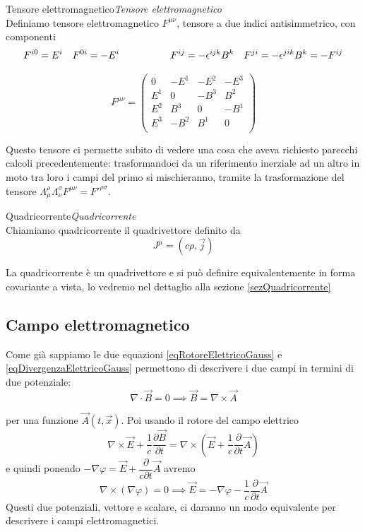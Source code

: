 \documentclass[12pt,a4paper,titlepage, twoside, openright]{book}
\newenvironment{definizione}[1][\empty]{\begin{Definizione}{
\ifx\empty#1\relax\else\mdseries\itshape#1\\\fi
}{}}{\end{Definizione}}
\numberwithin{equation}{chapter}
\begin{document}
\begin{definizione}[Tensore elettromagnetico]
Definiamo tensore elettromagnetico $F^{\mu\nu}$, tensore a due indici antisimmetrico, con componenti
\[
F^{i0}=E^i \quad F^{0i}=-E^i \hspace{0.15\linewidth} F^{ij}= - \epsilon^{ijk} B^k \quad F^{ji}= - \epsilon^{jik} B^k = - F^{ij}
\]

\begin{equation}
F^{\mu\nu}=\left( \begin{array}{cccc}
0 & -E^1 & -E^2 & -E^3 \\
E^1 & 0 & -B^3 & B^2 \\
E^2 & B^3 & 0 & -B^1 \\
E^3 & -B^2 & B^1 & 0 \\
\end{array}\right)
\end{equation}
\end{definizione}

Questo tensore ci permette subito di vedere una cosa che aveva richiesto parecchi calcoli precedentemente: trasformandoci da un riferimento inerziale ad un altro in moto tra loro i campi del primo si mischieranno, tramite la trasformazione del tensore $\Lambda_\mu^\rho \Lambda_\nu^\sigma F^{\mu\nu}=F'^{\rho\sigma                   }$.

\begin{definizione}[Quadricorrente]
Chiamiamo quadricorrente il quadrivettore definito da
\[
J^\mu= \left( c\rho,\vec{j} \right)
\]
\end{definizione}

La quadricorrente è un quadrivettore e si può definire equivalentemente in forma covariante a vista, lo vedremo nel dettaglio alla sezione \ref{sezQuadricorrente}

\subsection{Campo elettromagnetico}
Come già sappiamo le due equazioni \eqref{eqRotoreElettricoGauss} e \eqref{eqDivergenzaElettricoGauss} permettono di descrivere i due campi in termini di due potenziale:
\[
\nabla\cdot\vec{B}=0 \implies \vec{B}=\nabla\times\vec{A}
\]

per una funzione $\vec{A}(t,\vec{x})$. Poi usando il rotore del campo elettrico
\[
\nabla\times\vec{E}+\dfrac{1}{c}\dfrac{\partial\vec{B}}{\partial t}=\nabla\times\left(\vec{E}+\dfrac{1}{c}\dfrac{\partial}{\partial t}\vec{A} \right)
\]
e quindi ponendo $-\nabla\varphi=\vec{E}+\dfrac{\partial}{c\partial t}\vec{A}$ avremo
\[
\nabla\times(\nabla\varphi)=0 \implies \vec{E}=-\nabla\varphi-\dfrac{1}{c}\dfrac{\partial}{\partial t}\vec{A}
\]
Questi due potenziali, vettore e scalare, ci daranno un modo equivalente per descrivere i campi elettromagnetici. 
\end{document}
